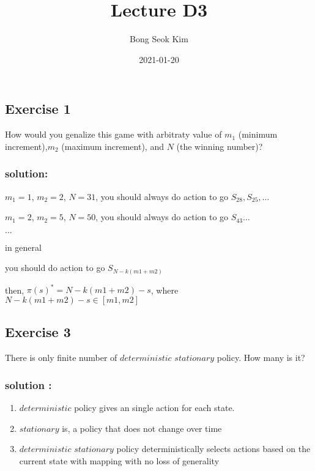 \documentclass[
  a4paper]{article}
\title{Lecture D3}
\author{Bong Seok Kim}
\date{2021-01-20}
\begin{document}
\maketitle

{
\setcounter{tocdepth}{2}
\tableofcontents
}
\hypertarget{exercise-1}{%
\subsection{Exercise 1}\label{exercise-1}}

How would you genalize this game with arbitraty value of \(m_1\)
(minimum increment),\(m_2\) (maximum increment), and \(N\) (the winning
number)?

\hypertarget{solution}{%
\subsubsection{solution:}\label{solution}}

\(m_1=1\), \(m_2=2\), \(N=31\), you should always do action to go
\(S_{28},S_{25},\dots\)

\(m_1=2\), \(m_2=5\), \(N=50\), you should always do action to go
\(S_{43}\dots\)

\(\dots\)

in general

you should do action to go \(S_{N-k(m1+m2)}\)

then, \(\pi{(s)}^*=N-k(m1+m2)-s\), where \(N-k(m1+m2)-s \in[m1,m2]\)

\newpage

\hypertarget{exercise-3}{%
\subsection{Exercise 3}\label{exercise-3}}

There is only finite number of \(deterministic\) \(stationary\) policy.
How many is it?

\hypertarget{solution-1}{%
\subsubsection{solution :}\label{solution-1}}

\begin{enumerate}
  \item $deterministic$ policy gives an single action for each state.
  \item $stationary$ is, a policy that does not change over time
  \item $deterministic$ $stationary$ policy deterministically selects actions based on the current state with mapping with no loss of generality
\end{enumerate}
\end{document}
